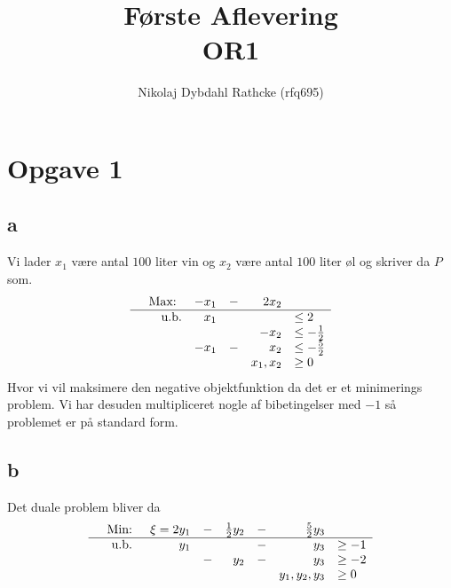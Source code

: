 \documentclass[12pt]{article}
\author{Nikolaj Dybdahl Rathcke (rfq695)}
\title{Første Aflevering \\ OR1}
\begin{document}
\maketitle
\section*{Opgave 1}
\subsection*{a}
Vi lader $x_1$ være antal $100$ liter vin og $x_2$ være antal $100$ liter øl og skriver da $P$ som.
\begin{equation}
\begin{array}{rrrrrl}
&\text{Max: } & -x_1 &- &2x_2 & \\
\hline
&\text{u.b.} &x_1 & & &\leq 2 \\
& & & &-x_2 &\leq -\frac{1}{2} \\
& &-x_1 &- &x_2 &\leq -\frac{5}{2} \\
& & & &x_1,x_2 &\geq 0
\end{array}
\end{equation}
Hvor vi vil maksimere den negative objektfunktion da det er et minimerings problem. Vi har desuden multipliceret nogle af bibetingelser med $-1$ så problemet er på standard form.

\subsection*{b}
Det duale problem bliver da
\begin{equation}
\begin{array}{rrrrrrrl}
&\text{Min: } &\xi=2y_1 &- &\frac{1}{2}y_2 &- &\frac{5}{2}y_3 & \\
\hline
&\text{u.b. } &y_1 & & &- &y_3 &\geq -1 \\
& & &- &y_2 &- &y_3 &\geq -2 \\
& & & & & &y_1,y_2,y_3 &\geq 0
\end{array}
\end{equation}
\newpage
\end{document}
